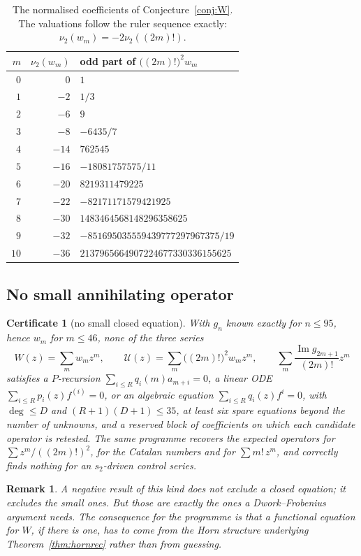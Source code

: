 \documentclass[10pt,a4paper]{amsart}
\newtheorem{certificate}[theorem]{Certificate}
\newtheorem{remark}[theorem]{Remark}
\begin{document}
\begin{table}[t]
\centering
\small
\begin{tabular}{@{}rrl@{}}
\toprule
$m$ & $\nu_2(w_m)$ & odd part of $\bigl((2m)!\bigr)^2w_m$\\
\midrule
$0$ & $0$   & $1$\\
$1$ & $-2$  & $1/3$\\
$2$ & $-6$  & $9$\\
$3$ & $-8$  & $-6435/7$\\
$4$ & $-14$ & $762545$\\
$5$ & $-16$ & $-18081757575/11$\\
$6$ & $-20$ & $8219311479225$\\
$7$ & $-22$ & $-82171171579421925$\\
$8$ & $-30$ & $1483464568148296358625$\\
$9$ & $-32$ & $-851695035559439777297967375/19$\\
$10$& $-36$ & $2137965664907224677330336155625$\\
\bottomrule
\end{tabular}
\caption{The normalised coefficients of Conjecture~\ref{conj:W}.  The valuations follow the ruler sequence exactly:
$\nu_2(w_m)=-2\nu_2((2m)!)$.}
\label{tab:units}
\end{table}

\subsection{No small annihilating operator}

\begin{certificate}[no small closed equation]\label{cert:noeq}
With $g_n$ known exactly for $n\le95$, hence $w_m$ for $m\le46$, none of the three series
\[
  W(z)=\sum_mw_mz^m,\qquad   \mathcal U(z)=\sum_m\bigl((2m)!\bigr)^2w_mz^m,\qquad   \sum_m\frac{\operatorname{Im}g_{2m+1}}{(2m)!}z^m
\]
satisfies a $P$-recursion $\sum_{i\le R}q_i(m)a_{m+i}=0$, a linear ODE $\sum_{i\le R}p_i(z)f^{(i)}=0$, or an algebraic equation $\sum_{i\le R}q_i(z)f^i=0$, with $\deg\le D$ and $(R+1)(D+1)\le35$, at least six spare equations beyond the number of unknowns, and a reserved block of coefficients on which each candidate operator is retested.  The same programme recovers the expected operators for $\sum z^m/((2m)!)^2$, for the Catalan numbers and for $\sum m!\,z^m$, and correctly finds nothing for an $s_2$-driven control series.
\end{certificate}

\begin{remark}
A negative result of this kind does not exclude a closed equation; it excludes the small ones.  But those are exactly the ones a Dwork--Frobenius argument needs.  The consequence for the programme is that a functional equation for $W$, if there is one, has to come from the Horn structure underlying Theorem~\ref{thm:hornrec} rather than from guessing.
\end{remark}
\end{document}
